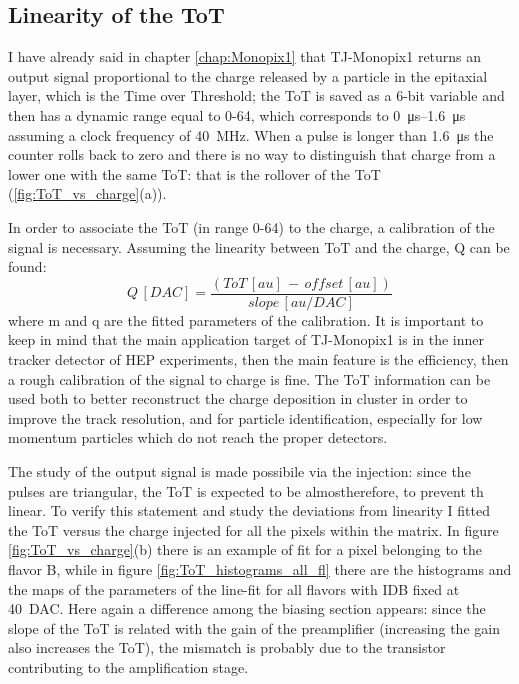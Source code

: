     \subsection{Linearity of the ToT}    
        I have already said in chapter \ref{chap:Monopix1} that TJ-Monopix1 returns an output signal proportional to the charge released by a particle in the epitaxial layer, which is the Time over Threshold; the ToT is saved as a 6-bit variable and then has a dynamic range equal to 0-64, which corresponds to \SIrange{0}{1.6}{\us} assuming a clock frequency of \SI{40}{MHz}.
        When a pulse is longer than \SI{1.6}{\us} the counter rolls back to zero and there is no way to distinguish that charge from a lower one with the same ToT: that is the rollover of the ToT (\ref{fig:ToT_vs_charge}(a)).   

        In order to associate the ToT (in range 0-64) to the charge, a calibration of the signal is necessary. Assuming the linearity between ToT and the charge, Q can be found: 
        \begin{equation}
            Q\, [DAC] = \frac{(ToT\,[au]\, -\, offset\,[au])}{slope\, [au/DAC]} 
        \end{equation}\label{eq:tot_dac}
        where m and q are the fitted parameters of the calibration.
        It is important to keep in mind that the main application target of TJ-Monopix1 is in the inner tracker detector of HEP experiments, then the main feature is the efficiency, then a rough calibration of the signal to charge is fine. The ToT information can be used both to better reconstruct the charge deposition in cluster in order to improve the track resolution, and for particle identification, especially for low momentum particles which do not reach the proper detectors.
                        
        The study of the output signal is made possibile via the injection: since the pulses are triangular, the ToT is expected to be almostherefore, to prevent th linear.
        To verify this statement and study the deviations from linearity I fitted the ToT versus the charge injected for all the pixels within the matrix.
        In figure \ref{fig:ToT_vs_charge}(b) there is an example of fit for a pixel belonging to the flavor B, while in figure \ref{fig:ToT_histograms_all_fl} there are the histograms and the maps of the parameters of the line-fit for all flavors with IDB fixed at \SI{40}{DAC}. Here again a difference among the biasing section appears: since the slope of the ToT is related with the gain of the preamplifier (increasing the gain also increases the ToT), the mismatch is probably due to the transistor contributing to the amplification stage.

